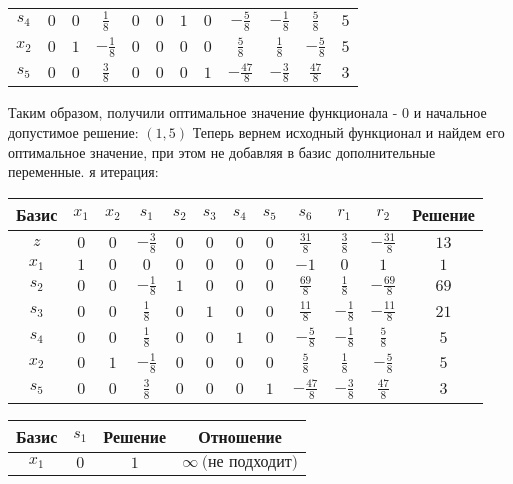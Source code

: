 \documentclass{article}%
\begin{document}
\begin{flushleft}
\begin{tabular}{|c|cccccccccc|c|}
$s_{4}$&$0$&$0$&$\frac{1}{8}$&$0$&$0$&$1$&$0$&$-\frac{5}{8}$&$-\frac{1}{8}$&$\frac{5}{8}$&$5$\\%
$x_{2}$&$0$&$1$&$-\frac{1}{8}$&$0$&$0$&$0$&$0$&$\frac{5}{8}$&$\frac{1}{8}$&$-\frac{5}{8}$&$5$\\%
$s_{5}$&$0$&$0$&$\frac{3}{8}$&$0$&$0$&$0$&$1$&$-\frac{47}{8}$&$-\frac{3}{8}$&$\frac{47}{8}$&$3$\\%
\hline%
\end{tabular}%
\newline%
\newline%
Таким образом, получили оптимальное значение функционала {-} 0 и начальное допустимое решение: %
$(1, 5)$%
\newline%
Теперь вернем исходный функционал и найдем его оптимальное значение, при этом не добавляя в базис дополнительные переменные.%
я итерация: %
\newline%
\newline%
\renewcommand{\arraystretch}{1.3}%
\begin{tabular}{|c|cccccccccc|c|}%
\hline%
Базис&$x_{1}$&$x_{2}$&$s_{1}$&$s_{2}$&$s_{3}$&$s_{4}$&$s_{5}$&$s_{6}$&$r_{1}$&$r_{2}$&Решение\\%
\hline%
$z$&$0$&$0$&$-\frac{3}{8}$&$0$&$0$&$0$&$0$&$\frac{31}{8}$&$\frac{3}{8}$&$-\frac{31}{8}$&$13$\\%
\hline%
$x_{1}$&$1$&$0$&$0$&$0$&$0$&$0$&$0$&$-1$&$0$&$1$&$1$\\%
$s_{2}$&$0$&$0$&$-\frac{1}{8}$&$1$&$0$&$0$&$0$&$\frac{69}{8}$&$\frac{1}{8}$&$-\frac{69}{8}$&$69$\\%
$s_{3}$&$0$&$0$&$\frac{1}{8}$&$0$&$1$&$0$&$0$&$\frac{11}{8}$&$-\frac{1}{8}$&$-\frac{11}{8}$&$21$\\%
$s_{4}$&$0$&$0$&$\frac{1}{8}$&$0$&$0$&$1$&$0$&$-\frac{5}{8}$&$-\frac{1}{8}$&$\frac{5}{8}$&$5$\\%
$x_{2}$&$0$&$1$&$-\frac{1}{8}$&$0$&$0$&$0$&$0$&$\frac{5}{8}$&$\frac{1}{8}$&$-\frac{5}{8}$&$5$\\%
$s_{5}$&$0$&$0$&$\frac{3}{8}$&$0$&$0$&$0$&$1$&$-\frac{47}{8}$&$-\frac{3}{8}$&$\frac{47}{8}$&$3$\\%
\hline%
\end{tabular}%
\newline%
\newline%
\newline%
\begin{tabular}{|cccc|}%
\hline%
Базис&$s_{1}$&Решение&Отношение\\%
\hline%
$x_{1}$&$0$&$1$&$\infty \: \text{(не подходит)}$\\%

\end{tabular}
\end{flushleft}
\end{document}
